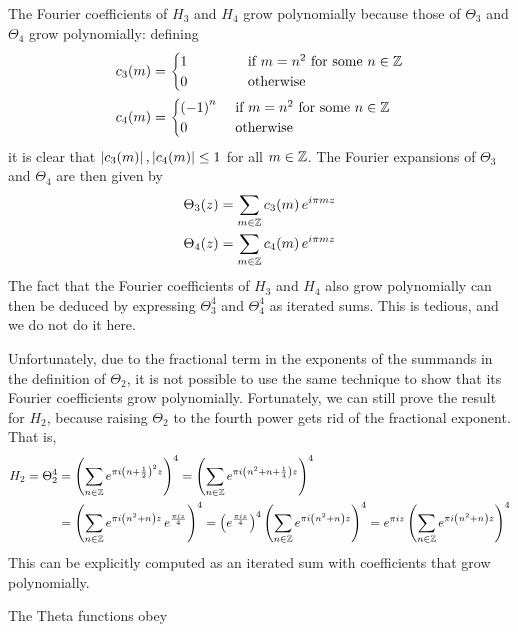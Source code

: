 The Fourier coefficients of $H_3$ and $H_4$ grow polynomially because those of $\Theta_3$ and $\Theta_4$ grow polynomially: defining
\begin{align*}
    c_3(m) &=
    \begin{cases}
        1 \quad\quad\quad & \text{ if } m = n^2 \text{ for some } n \in \mathbb{Z} \\
        0 \quad\quad\quad & \text{ otherwise}
    \end{cases} \\
    c_4(m) &=
    \begin{cases}
        \left( -1 \right)^n & \text{ if } m = n^2 \text{ for some } n \in \mathbb{Z} \\
        0 & \text{ otherwise}
    \end{cases}
\end{align*}
it is clear that $\left\lvert c_3(m) \right\rvert, \left\lvert c_4(m) \right\rvert \leq 1$ for all $m \in \mathbb{Z}$. The Fourier expansions of $\Theta_3$ and $\Theta_4$ are then given by
\begin{align*}
    \Theta_{3}\!\left( z \right) &= \sum_{m \in \mathbb{Z}} c_3(m) \, e^{i\pi m z} \\
    \Theta_{4}\!\left( z \right) &= \sum_{m \in \mathbb{Z}} c_4(m) \, e^{i\pi m z}
\end{align*}
The fact that the Fourier coefficients of $H_3$ and $H_4$ also grow polynomially can then be deduced by expressing $\Theta_3^4$ and $\Theta_4^4$ as iterated sums. This is tedious, and we do not do it here.

Unfortunately, due to the fractional term in the exponents of the summands in the definition of $\Theta_2$, it is not possible to use the same technique to show that its Fourier coefficients grow polynomially. Fortunately, we can still prove the result for $H_2$, because raising $\Theta_2$ to the fourth power gets rid of the fractional exponent. That is,
\begin{align*}
    H_2 = \Theta_2^4
    &= \left( \sum_{n \in \mathbb{Z}} e^{\pi i \left( n + \frac{1}{2} \right)^2 z} \right)^4
    = \left( \sum_{n \in \mathbb{Z}} e^{\pi i \left( n^2 + n + \frac{1}{4} \right) z} \right)^4 \\
    &= \left( \sum_{n \in \mathbb{Z}} e^{\pi i \left( n^2 + n \right) z} \, e^{\frac{\pi i z}{4}} \right)^4
    = \left( e^{\frac{\pi i z}{4}} \right)^4  \left( \sum_{n \in \mathbb{Z}} e^{\pi i \left( n^2 + n \right) z} \right)^4
    = e^{\pi i z} \left( \sum_{n \in \mathbb{Z}} e^{\pi i \left( n^2 + n \right) z} \right)^4
\end{align*}
This can be explicitly computed as an iterated sum with coefficients that grow polynomially.

The Theta functions obey
